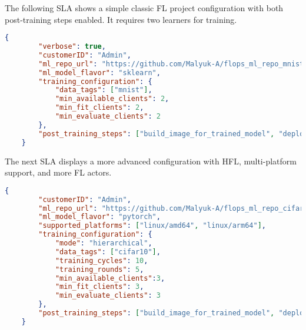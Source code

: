 The following SLA shows a simple classic FL project configuration with both post-training steps enabled.
It requires two learners for training.

\begin{lstlisting}[language=json]
    {
        "verbose": true,
        "customerID": "Admin",
        "ml_repo_url": "https://github.com/Malyuk-A/flops_ml_repo_mnist_sklearn",
        "ml_model_flavor": "sklearn",
        "training_configuration": {
            "data_tags": ["mnist"],
            "min_available_clients": 2,
            "min_fit_clients": 2,
            "min_evaluate_clients": 2
        },
        "post_training_steps": ["build_image_for_trained_model", "deploy_trained_model_image"],
    }
\end{lstlisting}

The next SLA displays a more advanced configuration with HFL, multi-platform support, and more FL actors.

\begin{lstlisting}[language=json]
    {
        "customerID": "Admin",
        "ml_repo_url": "https://github.com/Malyuk-A/flops_ml_repo_cifar10_pytorch",
        "ml_model_flavor": "pytorch",
        "supported_platforms": ["linux/amd64", "linux/arm64"],
        "training_configuration": {
            "mode": "hierarchical",
            "data_tags": ["cifar10"],
            "training_cycles": 10,
            "training_rounds": 5,
            "min_available_clients":3,
            "min_fit_clients": 3,
            "min_evaluate_clients": 3
        },
        "post_training_steps": ["build_image_for_trained_model", "deploy_trained_model_image"],
    }
\end{lstlisting}